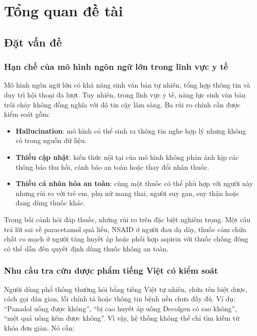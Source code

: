 \chapter{Tổng quan đề tài}

\section{Đặt vấn đề}

\subsection{Hạn chế của mô hình ngôn ngữ lớn trong lĩnh vực y tế}

Mô hình ngôn ngữ lớn có khả năng sinh văn bản tự nhiên, tổng hợp thông tin và duy trì hội thoại đa lượt. Tuy nhiên, trong lĩnh vực y tế, năng lực sinh văn bản trôi chảy không đồng nghĩa với độ tin cậy lâm sàng. Ba rủi ro chính cần được kiểm soát gồm:

\begin{itemize}
  \item \textbf{Hallucination}: mô hình có thể sinh ra thông tin nghe hợp lý nhưng không có trong nguồn dữ liệu.
  \item \textbf{Thiếu cập nhật}: kiến thức nội tại của mô hình không phản ánh kịp các thông báo thu hồi, cảnh báo an toàn hoặc thay đổi nhãn thuốc.
  \item \textbf{Thiếu cá nhân hóa an toàn}: cùng một thuốc có thể phù hợp với người này nhưng rủi ro với trẻ em, phụ nữ mang thai, người suy gan, suy thận hoặc đang dùng thuốc khác.
\end{itemize}

Trong bối cảnh hỏi đáp thuốc, những rủi ro trên đặc biệt nghiêm trọng. Một câu trả lời sai về paracetamol quá liều, NSAID ở người đau dạ dày, thuốc cảm chứa chất co mạch ở người tăng huyết áp hoặc phối hợp aspirin với thuốc chống đông có thể dẫn đến quyết định dùng thuốc không an toàn.

\subsection{Nhu cầu tra cứu dược phẩm tiếng Việt có kiểm soát}

Người dùng phổ thông thường hỏi bằng tiếng Việt tự nhiên, chứa tên biệt dược, cách gọi dân gian, lỗi chính tả hoặc thông tin bệnh nền chưa đầy đủ. Ví dụ: ``Panadol uống được không'', ``bị cao huyết áp uống Decolgen có sao không'', ``mệt quá uống kẽm được không''. Vì vậy, hệ thống không thể chỉ tìm kiếm từ khóa đơn giản. Nó cần:

